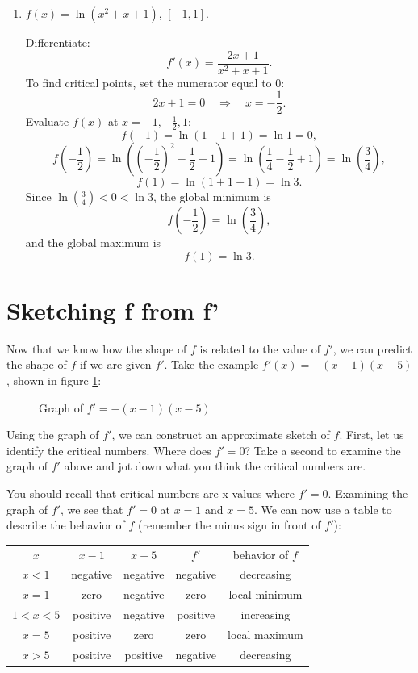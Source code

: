 \begin{Answer}[ref=gloext2]
\begin{enumerate}
	\item $f(x) = \ln(x^2 + x + 1)$, $[-1,1]$.

	Differentiate:
	\[
	f'(x) = \frac{2x+1}{x^2 + x + 1}.
	\]
	To find critical points, set the numerator equal to $0$:
	\[
	2x + 1 = 0 \quad \Rightarrow \quad x = -\frac{1}{2}.
	\]
	Evaluate $f(x)$ at $x = -1, -\frac{1}{2}, 1$:
	\[
	f(-1) = \ln(1 - 1 + 1) = \ln 1 = 0,
	\]
	\[
	f\!\left(-\frac{1}{2}\right) 
	= \ln\!\left(\left(-\frac{1}{2}\right)^2 - \frac{1}{2} + 1\right)
	= \ln\!\left(\frac{1}{4} - \frac{1}{2} + 1\right)
	= \ln\!\left(\frac{3}{4}\right),
	\]
	\[
	f(1) = \ln(1 + 1 + 1) = \ln 3.
	\]
	Since $\ln\!\left(\frac{3}{4}\right) < 0 < \ln 3$, the global minimum is
	\[
	f\!\left(-\frac{1}{2}\right) = \ln\!\left(\frac{3}{4}\right),
	\]
	and the global maximum is
	\[
	f(1) = \ln 3.
	\]
\end{enumerate}
\end{Answer}


\section{Sketching f from f'}
Now that we know how the shape of $f$ is related to the value of $f'$, we can 
predict the shape of $f$ if we are given $f'$. Take the example $f'(x) = -(x-1)
(x-5)$, shown in figure \ref{fig:sketchf1}:

\begin{figure}[H]
	\centering
	\caption{Graph of $f'=-(x-1)(x-5)$}
	\label{fig:sketchf1}
\end{figure}

Using the graph of $f'$, we can construct an approximate sketch of $f$. First, 
let us identify the critical numbers. Where does $f'=0$? Take a second to 
examine the graph of $f'$ above and jot down what you think the critical 
numbers are.

You should recall that critical numbers are x-values where $f'=0$. Examining 
the graph of $f'$, we see that $f'=0$ at $x=1$ and $x=5$. We can now use a 
table to describe the behavior of $f$ (remember the minus sign in front of $f'$):

\begin{tabular}{c|c|c|c|c}
$x$ & $x-1$ & $x-5$ & $f'$ & behavior of $f$\\
$x<1$ & negative & negative & negative & decreasing\\
$x=1$ & zero & negative & zero & local minimum\\
$1<x<5$ & positive & negative & positive & increasing\\
$x=5$ & positive & zero & zero & local maximum\\
$x>5$ & positive & positive & negative & decreasing\\
\end{tabular}


